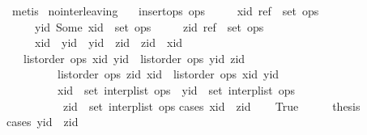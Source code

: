 \begin{isabellebody}
\ metis\isanewline
{}\isamarkupfalse%
%
\endisatagproof
{\isafoldproof}%
%
\isadelimproof
\isanewline
%
\endisadelimproof
\isanewline
{}\isamarkupfalse%
\ no{\isacharunderscore}interleaving{\isacharcolon}\isanewline
\ \ \ {\isachardoublequoteopen}insert{\isacharunderscore}ops\ ops{\isachardoublequoteclose}\isanewline
\ \ \ \ \ {\isachardoublequoteopen}{\isacharparenleft}xid{\isacharcomma}\ ref{\isacharparenright}\ {\isasymin}\ set\ ops{\isachardoublequoteclose}\isanewline
\ \ \ \ \ {\isachardoublequoteopen}{\isacharparenleft}yid{\isacharcomma}\ Some\ xid{\isacharparenright}\ {\isasymin}\ set\ ops{\isachardoublequoteclose}\isanewline
\ \ \ \ \ {\isachardoublequoteopen}{\isacharparenleft}zid{\isacharcomma}\ ref{\isacharparenright}\ {\isasymin}\ set\ ops{\isachardoublequoteclose}\isanewline
\ \ \ \ \ {\isachardoublequoteopen}xid\ {\isasymnoteq}\ yid{\isachardoublequoteclose}\ \ {\isachardoublequoteopen}yid\ {\isasymnoteq}\ zid{\isachardoublequoteclose}\ \ {\isachardoublequoteopen}zid\ {\isasymnoteq}\ xid{\isachardoublequoteclose}\isanewline
\ \ \ {\isachardoublequoteopen}{\isacharparenleft}list{\isacharunderscore}order\ ops\ xid\ yid\ {\isasymand}\ list{\isacharunderscore}order\ ops\ yid\ zid{\isacharparenright}\ {\isasymor}\isanewline
\ \ \ \ \ \ \ \ \ {\isacharparenleft}list{\isacharunderscore}order\ ops\ zid\ xid\ {\isasymand}\ list{\isacharunderscore}order\ ops\ xid\ yid{\isacharparenright}\ {\isasymor}\isanewline
\ \ \ \ \ \ \ \ \ {\isacharparenleft}xid\ {\isasymnotin}\ set\ {\isacharparenleft}interp{\isacharunderscore}list\ ops{\isacharparenright}\ {\isasymand}\ yid\ {\isasymnotin}\ set\ {\isacharparenleft}interp{\isacharunderscore}list\ ops{\isacharparenright}\ {\isasymand}\isanewline
\ \ \ \ \ \ \ \ \ \ zid\ {\isasymnotin}\ set\ {\isacharparenleft}interp{\isacharunderscore}list\ ops{\isacharparenright}{\isacharparenright}{\isachardoublequoteclose}\isanewline
%
\isadelimproof
%
\endisadelimproof
%
\isatagproof
{}\isamarkupfalse%
{\isacharparenleft}cases\ {\isachardoublequoteopen}xid\ {\isacharless}\ zid{\isachardoublequoteclose}{\isacharparenright}\isanewline
\ \ \isamarkupfalse%
\ True\isanewline
\ \ \isamarkupfalse%
\ \isamarkupfalse%
\ {\isacharquery}thesis\isanewline
\ \ \isamarkupfalse%
{\isacharparenleft}cases\ {\isachardoublequoteopen}yid\ {\isacharless}\ zid{\isachardoublequoteclose}{\isacharparenright}\isanewline

\end{isabellebody}
